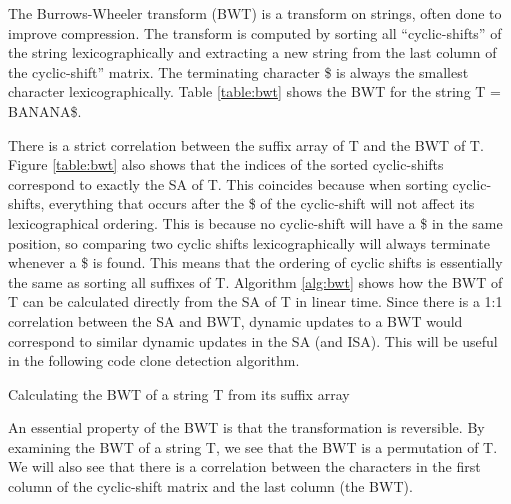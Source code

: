 
The Burrows-Wheeler transform (BWT) is a transform on strings, often done to improve
compression. The transform is computed by sorting all ``cyclic-shifts'' of the string
lexicographically and extracting a new string from the last column of the cyclic-shift''
matrix. The terminating character \$ is always the smallest character lexicographically.
Table \ref{table:bwt} shows the BWT for the string T = BANANA\$.

There is a strict correlation between the suffix array of T and the BWT of T. Figure
\ref{table:bwt} also shows that the indices of the sorted cyclic-shifts correspond to
exactly the SA of T. This coincides because when sorting cyclic-shifts, everything that
occurs after the \$ of the cyclic-shift will not affect its lexicographical ordering. This
is because no cyclic-shift will have a \$ in the same position, so comparing two cyclic
shifts lexicographically will always terminate whenever a \$ is found. This means that the
ordering of cyclic shifts is essentially the same as sorting all suffixes of T. Algorithm
\ref{alg:bwt} shows how the BWT of T can be calculated directly from the SA of T in linear
time. Since there is a 1:1 correlation between the SA and BWT, dynamic updates to a BWT
would correspond to similar dynamic updates in the SA (and ISA). This will be useful in
the following code clone detection algorithm.

\begin{algorithm}[htp]
  \SetAlgoLined\DontPrintSemicolon

  \vspace{0.5cm}
  \caption{Calculating the BWT of a string T from its suffix array}
  \label{alg:bwt}
\end{algorithm}


An essential property of the BWT is that the transformation is reversible. By examining
the BWT of a string T, we see that the BWT is a permutation of T. We will also see that
there is a correlation between the characters in the first column of the cyclic-shift
matrix and the last column (the BWT).

